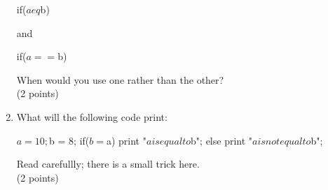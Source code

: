 \documentclass[11pt]{article}
\begin{document}
\begin{enumerate}
  \begin{perlcode}
  if($a eq $b)
  \end{perlcode}
  and

  \begin{perlcode}
  if($a == $b)
  \end{perlcode}
  When would you use one rather than the other?\\
  (2 points)
\item What will the following code print:

  \begin{perlcode}
  $a = 10;
  $b = 8;
  if($b = $a){
    print "$a is equal to $b\n";
  }else{
    print "$a is not equal to $b\n";
  }
  \end{perlcode}
  Read carefullly; there is a small trick here.\\
  (2 points)
\end{enumerate}
\end{document}
